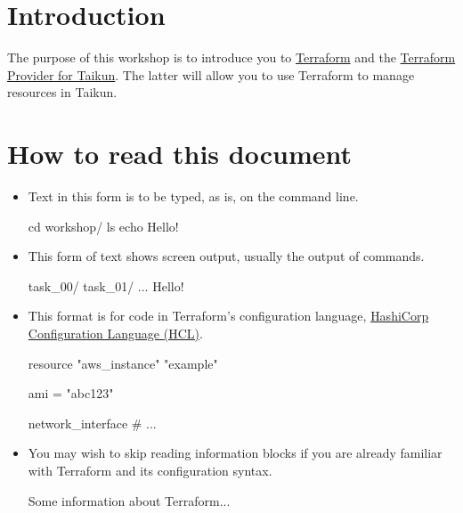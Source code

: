\section{Introduction}
The purpose of this workshop is to introduce you to
\href{https://www.terraform.io/intro/index.html}{Terraform}
and the \href{https://registry.terraform.io/providers/itera-io/taikun/latest}{Terraform Provider for Taikun}.
The latter will allow you to use Terraform to manage resources in Taikun.

\section{How to read this document}

\begin{itemize}
  \item Text in this form is to be typed, as is, on the command line.
\begin{shell}
cd workshop/
ls
echo Hello!
\end{shell}
\item This form of text shows screen output, usually the output of commands.
\begin{raw}
task_00/
task_01/
...
Hello!
\end{raw}
\item This format is for code in Terraform's configuration language,
\href{https://www.terraform.io/docs/language/syntax/configuration.html}{HashiCorp Configuration Language (HCL)}.
\begin{tf}
resource "aws_instance" "example" {
  ami = "abc123"

  network_interface {
    # ...
  }
}
\end{tf}
\item You may wish to skip reading information blocks if you are already familiar with
Terraform and its configuration syntax.
\begin{tip}
  Some information about Terraform...
\end{tip}
\end{itemize}
